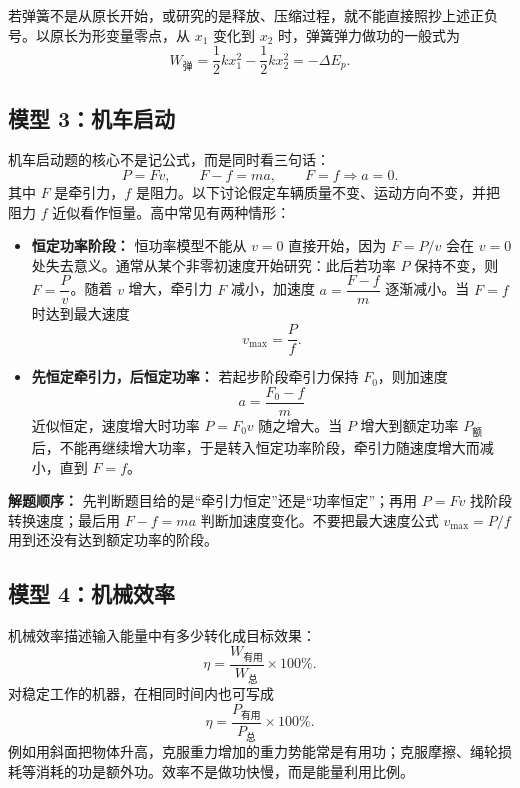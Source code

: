 若弹簧不是从原长开始，或研究的是释放、压缩过程，就不能直接照抄上述正负号。以原长为形变量零点，从 $x_1$ 变化到 $x_2$ 时，弹簧弹力做功的一般式为
\[
W_{\text{弹}}
=\frac12kx_1^2-\frac12kx_2^2
=-\Delta E_p.
\]

\subsection*{模型 3：机车启动}

机车启动题的核心不是记公式，而是同时看三句话：
\[
P=Fv,\qquad F-f=ma,\qquad F=f\Rightarrow a=0.
\]
其中 $F$ 是牵引力，$f$ 是阻力。以下讨论假定车辆质量不变、运动方向不变，并把阻力 $f$ 近似看作恒量。高中常见有两种情形：

\begin{itemize}
  \item \textbf{恒定功率阶段：} 恒功率模型不能从 $v=0$ 直接开始，因为 $F=P/v$ 会在 $v=0$ 处失去意义。通常从某个非零初速度开始研究：此后若功率 $P$ 保持不变，则 $F=\dfrac{P}{v}$。随着 $v$ 增大，牵引力 $F$ 减小，加速度 $a=\dfrac{F-f}{m}$ 逐渐减小。当 $F=f$ 时达到最大速度
  \[
  v_{\max}=\frac{P}{f}.
  \]
  \item \textbf{先恒定牵引力，后恒定功率：} 若起步阶段牵引力保持 $F_0$，则加速度
  \[
  a=\frac{F_0-f}{m}
  \]
  近似恒定，速度增大时功率 $P=F_0v$ 随之增大。当 $P$ 增大到额定功率 $P_{\text{额}}$ 后，不能再继续增大功率，于是转入恒定功率阶段，牵引力随速度增大而减小，直到 $F=f$。
\end{itemize}

\begin{center}


\label{fig:vehicle-startup-power}
\end{center}

\textbf{解题顺序：} 先判断题目给的是“牵引力恒定”还是“功率恒定”；再用 $P=Fv$ 找阶段转换速度；最后用 $F-f=ma$ 判断加速度变化。不要把最大速度公式 $v_{\max}=P/f$ 用到还没有达到额定功率的阶段。

\subsection*{模型 4：机械效率}

机械效率描述输入能量中有多少转化成目标效果：
\[
\eta=\frac{W_{\text{有用}}}{W_{\text{总}}}\times100\%.
\]
对稳定工作的机器，在相同时间内也可写成
\[
\eta=\frac{P_{\text{有用}}}{P_{\text{总}}}\times100\%.
\]
例如用斜面把物体升高，克服重力增加的重力势能常是有用功；克服摩擦、绳轮损耗等消耗的功是额外功。效率不是做功快慢，而是能量利用比例。

